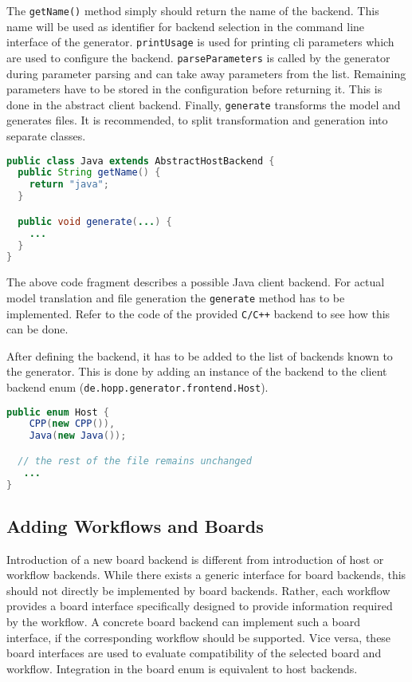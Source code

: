 \documentclass{report}
\begin{document}
The \texttt{getName()} method simply should return the name of the backend. This name will be used as identifier for backend selection in the command line interface of the generator. \texttt{printUsage} is used for printing cli parameters which are used to configure the backend. \texttt{parseParameters} is called by the generator during parameter parsing and can take away parameters from the list. Remaining parameters have to be stored in the configuration before returning it. This is done in the abstract client backend. Finally, \texttt{generate} transforms the model and generates files. It is recommended, to split transformation and generation into separate classes.

\begin{lstlisting}[language=java]
public class Java extends AbstractHostBackend {
  public String getName() {
    return "java";
  }

  public void generate(...) {
    ...
  }
}
\end{lstlisting}

The above code fragment describes a possible Java client backend. For actual model translation and file generation the \texttt{generate} method has to be implemented. Refer to the code of the provided \texttt{C/C++} backend to see how this can be done.

After defining the backend, it has to be added to the list of backends known to the generator. This is done by adding an instance of the backend to the client backend enum (\texttt{de.hopp.generator.frontend.Host}).

\begin{lstlisting}[language=java]
public enum Host {
    CPP(new CPP()),
    Java(new Java());

  // the rest of the file remains unchanged
   ...
}
\end{lstlisting}

\subsection{Adding Workflows and Boards}

Introduction of a new board backend is different from introduction of host or workflow backends. While there exists a generic interface for board backends, this should not directly be implemented by board backends. Rather, each workflow provides a board interface specifically designed to provide information required by the workflow. A concrete board backend can implement such a board interface, if the corresponding workflow should be supported. Vice versa, these board interfaces are used to evaluate compatibility of the selected board and workflow. Integration in the board enum is equivalent to host backends.
\end{document}
